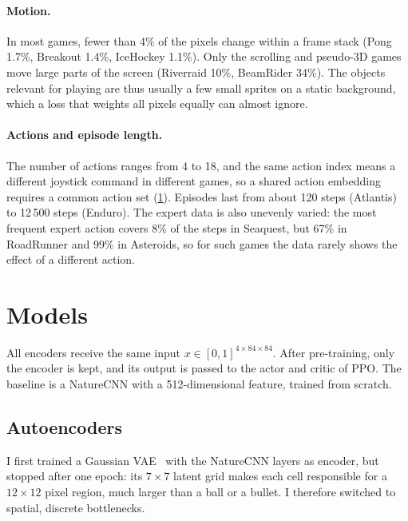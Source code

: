 \documentclass[runningheads]{llncs}
\begin{document}
\paragraph{Motion.} In most games, fewer than 4\% of the pixels change within a frame stack
(Pong 1.7\%, Breakout 1.4\%, IceHockey 1.1\%). Only the scrolling and pseudo-3D games move large
parts of the screen (Riverraid 10\%, BeamRider 34\%). The objects relevant for playing are thus usually a few small sprites on a static background,
which a loss that weights all pixels equally can almost ignore.

\paragraph{Actions and episode length.} The number of actions ranges from 4 to 18, and the same
action index means a different joystick command in different games, so a shared action
embedding requires a common action set (\cref{sec:models}). Episodes last from about
120 steps (Atlantis) to 12\,500 steps (Enduro). The expert data is also unevenly varied: the most frequent expert action covers 8\% of the
steps in Seaquest, but 67\% in RoadRunner and 99\% in Asteroids, so for such games the data
rarely shows the effect of a different action.

\section{Models}
\label{sec:models}

All encoders receive the same input $x\in[0,1]^{4\times84\times84}$. After pre-training, only the encoder is kept, and its output is passed to the actor and critic
of PPO. The baseline is a NatureCNN with a 512-dimensional feature, trained
from scratch.

\subsection{Autoencoders}

I first trained a Gaussian VAE~\cite{kingma2014vae} with the NatureCNN layers as encoder,
but stopped after one epoch: its $7\times7$ latent grid makes each cell responsible for a
$12\times12$ pixel region, much larger than a ball or a bullet. I therefore switched to spatial,
discrete bottlenecks.
\end{document}
